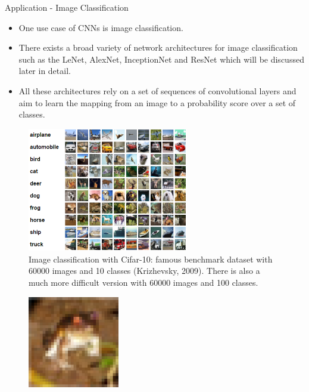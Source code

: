 





\newcommand{\titlefigure}{figure/cifar10_eg.png}
\newcommand{\learninggoals}{
  \item Application of CNNs in Visual Recognition
}


\begin{vbframe}{Application - Image Classification}
    \begin{itemize}
        \item One use case of CNNs is image classification.
        \item There exists a broad variety of network architectures for image classification such as the LeNet, AlexNet, InceptionNet and ResNet which will be discussed later in detail.
        \item All these architectures rely on a set of sequences of convolutional layers and aim to learn the mapping from an image to a probability score over a set of classes.
    \end{itemize}
\framebreak
    \begin{figure}
        \centering
        \includegraphics[width=7cm]{figure/recognition.png}
        \caption{Image classification with Cifar-10: famous benchmark dataset with 60000 images and 10 classes (Krizhevsky, 2009). There is also a much more difficult version with 60000 images and 100 classes.}
    \end{figure}
\framebreak
    \begin{figure}
        \centering
        \includegraphics[width=4cm]{figure/cifar_frog.png}

\end{figure}
\end{vbframe}
